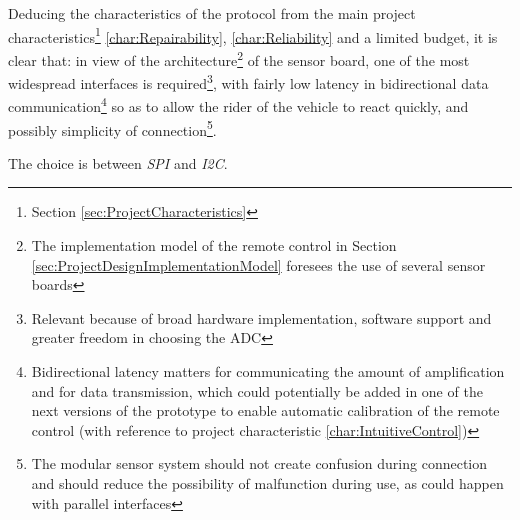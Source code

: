 \documentclass[a4paper, 10pt, final]{article} %
\begin{document}
    Deducing the characteristics of the protocol from the main project characteristics\footnote{Section \ref{sec:ProjectCharacteristics}} \ref{char:Repairability}, \ref{char:Reliability} and a limited budget, it is clear that: in view of the architecture\footnote{The implementation model of the remote control in Section \ref{sec:ProjectDesignImplementationModel} foresees the use of several sensor boards} of the sensor board, one of the most widespread interfaces is required\footnote{Relevant because of broad hardware implementation, software support and greater freedom in choosing the ADC}, with fairly low latency in bidirectional data communication\footnote{Bidirectional latency matters for communicating the amount of amplification and for data transmission, which could potentially be added in one of the next versions of the prototype to enable automatic calibration of the remote control (with reference to project characteristic \ref{char:IntuitiveControl})} so as to allow the rider of the vehicle to react quickly, and possibly simplicity of connection\footnote{The modular sensor system should not create confusion during connection and should reduce the possibility of malfunction during use, as could happen with parallel interfaces}.

    \vspace{2ex}
    \Centering
    The choice is between \emph{SPI} and \emph{I2C}.

    \vspace{2ex}
    \justifying
\end{document}

